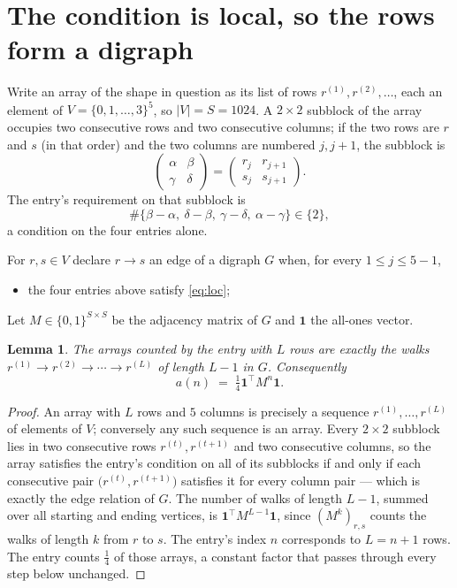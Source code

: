 \documentclass[11pt,a4paper]{article}
\theoremstyle{plain}
\newtheorem{lemma}[theorem]{Lemma}
\theoremstyle{definition}
\begin{document}
\section{The condition is local, so the rows form a digraph}

Write an array of the shape in question as its list of rows
$r^{(1)},r^{(2)},\dots$, each an element of
$V=\{0,1,\dots,3\}^{5}$, so $|V|=S=1024$. A $2\times2$ subblock of the array
occupies two consecutive rows and two consecutive columns; if the two rows are $r$
and $s$ (in that order) and the two columns are numbered $j,j+1$,
the subblock is
\[
\begin{pmatrix}\alpha&\beta\\\gamma&\delta\end{pmatrix}=\begin{pmatrix}r_j&r_{j+1}\\s_j&s_{j+1}\end{pmatrix}.
\]
The entry's requirement on that subblock is
\begin{equation}\label{eq:loc}
\#\{\beta-\alpha,\ \delta-\beta,\ \gamma-\delta,\ \alpha-\gamma\}\in\{2\},
\end{equation}
a condition on the four entries alone.

For $r,s\in V$ declare $r\to s$ an edge of a digraph $G$ when, for every
$1\le j\le 5-1$,
\begin{itemize}
\item the four entries above satisfy \eqref{eq:loc};

\end{itemize}
Let $M\in\{0,1\}^{S\times S}$ be the adjacency matrix of $G$ and $\mathbf{1}$ the
all-ones vector.

\begin{lemma}\label{lem:walk}
The arrays counted by the entry with $L$ rows are exactly the walks
$r^{(1)}\to r^{(2)}\to\cdots\to r^{(L)}$ of length $L-1$ in $G$. Consequently
\[
a(n)\;=\;\tfrac1{4}\mathbf{1}^{\!\top}M^{n}\mathbf{1} .
\]
\end{lemma}

\begin{proof}
An array with $L$ rows and $5$ columns is precisely a sequence
$r^{(1)},\dots,r^{(L)}$ of elements of $V$; conversely any such sequence is an array.
Every $2\times2$ subblock lies in two consecutive rows $r^{(t)},r^{(t+1)}$ and two
consecutive columns, so the array satisfies the entry's condition on all of its subblocks
if and only if each consecutive pair $\bigl(r^{(t)},r^{(t+1)}\bigr)$ satisfies it for
every column pair --- which is exactly the edge relation of $G$. The number of walks of
length $L-1$, summed over all starting and ending vertices, is
$\mathbf{1}^{\!\top}M^{L-1}\mathbf{1}$, since $(M^{k})_{r,s}$ counts the walks of
length $k$ from $r$ to $s$. The entry's index $n$ corresponds to $L=n+1$ rows. The entry counts $\tfrac1{4}$ of those arrays, a constant factor that passes through every step below unchanged.
\end{proof}
\end{document}
